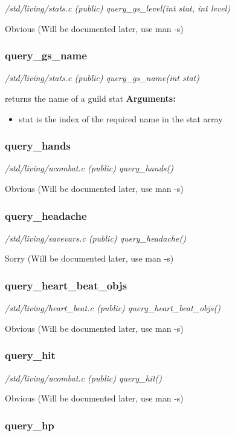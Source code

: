 {\em /std/living/stats.c (public) query\_gs\_level(int stat, int level)}

Obvious (Will be documented later, use man -s)


\subsubsection{query\_gs\_name}

{\em /std/living/stats.c (public) query\_gs\_name(int stat)}

returns the name of a guild stat
{\bf Arguments:}
\begin{itemize}
\item stat is the index of the required name in the stat array
\end{itemize}


\subsubsection{query\_hands}

{\em /std/living/ucombat.c (public) query\_hands()}

Obvious (Will be documented later, use man -s)


\subsubsection{query\_headache}

{\em /std/living/savevars.c (public) query\_headache()}

Sorry (Will be documented later, use man -s)


\subsubsection{query\_heart\_beat\_objs}

{\em /std/living/heart\_beat.c (public) query\_heart\_beat\_objs()}

Obvious (Will be documented later, use man -s)


\subsubsection{query\_hit}

{\em /std/living/ucombat.c (public) query\_hit()}

Obvious (Will be documented later, use man -s)


\subsubsection{query\_hp}

